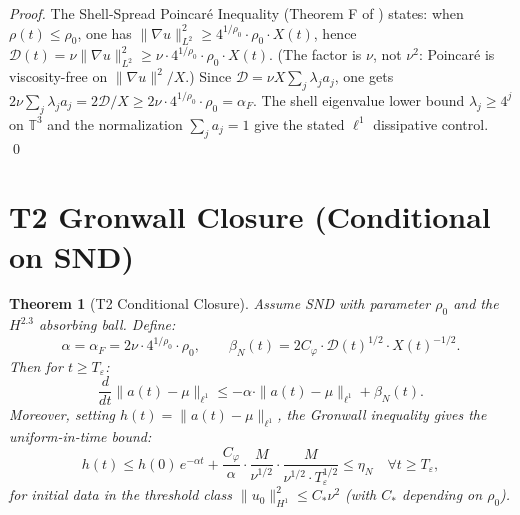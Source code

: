 \documentclass[11pt]{article}
\newtheorem{theorem}{Theorem}[section]
\begin{document}
\begin{proof}
The Shell-Spread Poincar\'{e} Inequality (Theorem F of \cite{SimonsNS2026})
states: when $\rho(t)\leq\rho_0$, one has
$\|\nabla u\|_{L^2}^2\geq 4^{1/\rho_0}\cdot\rho_0\cdot X(t)$, hence
$\mathcal{D}(t)=\nu\|\nabla u\|_{L^2}^2\geq\nu\cdot 4^{1/\rho_0}\cdot\rho_0\cdot X(t)$.
(The factor is $\nu$, not $\nu^2$: Poincar\'e is viscosity-free on $\|\nabla u\|^2/X$.)
Since $\mathcal{D}=\nu X\sum_j\lambda_j a_j$, one gets
$2\nu\sum_j\lambda_j a_j=2\mathcal{D}/X\geq 2\nu\cdot 4^{1/\rho_0}\cdot\rho_0=\alpha_F$.
The shell eigenvalue lower bound $\lambda_j\geq 4^j$ on $\mathbb{T}^3$
and the normalization $\sum_j a_j = 1$ give the stated $\ell^1$ dissipative control.
\qed
\end{proof}

\section{T2 Gronwall Closure (Conditional on SND)}

\begin{theorem}[T2 Conditional Closure]\label{thm:T2}
Assume SND with parameter $\rho_0$ and the $H^{2.3}$ absorbing ball.
Define:
\[
\alpha = \alpha_F = 2\nu\cdot 4^{1/\rho_0}\cdot\rho_0,
\qquad
\beta_N(t) = 2C_\varphi\cdot\mathcal{D}(t)^{1/2}\cdot X(t)^{-1/2}.
\]
Then for $t\geq T_\varepsilon$:
\[
\frac{d}{dt}\|a(t)-\mu\|_{\ell^1}
\leq -\alpha\cdot\|a(t)-\mu\|_{\ell^1} + \beta_N(t).
\]
Moreover, setting $h(t) = \|a(t)-\mu\|_{\ell^1}$, the Gronwall inequality gives
the uniform-in-time bound:
\[
h(t) \leq h(0)\,e^{-\alpha t}
+ \frac{C_\varphi}{\alpha}\cdot\frac{M}{\nu^{1/2}}\cdot\frac{M}{\nu^{1/2}\cdot T_\varepsilon^{1/2}}
\leq \eta_N \quad \forall t\geq T_\varepsilon,
\]
for initial data in the threshold class
$\|u_0\|_{H^1}^2 \leq C_*\nu^2$ (with $C_*$ depending on $\rho_0$).
\end{theorem}
\end{document}
